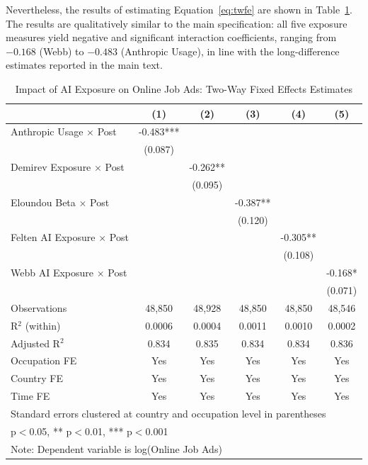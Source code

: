 \documentclass[11pt]{article}
\begin{document}
Nevertheless, the results of estimating Equation~\ref{eq:twfe} are shown in Table~\ref{table:twfe_models}. The results are qualitatively similar to the main specification: all five exposure measures yield negative and significant interaction coefficients, ranging from $-0.168$ (Webb) to $-0.483$ (Anthropic Usage), in line with the long-difference estimates reported in the main text.

\begin{table}[H]
\centering
\caption{Impact of AI Exposure on Online Job Ads: Two-Way Fixed Effects Estimates}
\begin{tabular}{lccccc}
\hline\hline
 & (1) & (2) & (3) & (4) & (5) \\
\midrule
Anthropic Usage $\times$ Post & -0.483*** & & & & \\
 & (0.087) & & & & \\
Demirev Exposure $\times$ Post & & -0.262** & & & \\
 & & (0.095) & & & \\
Eloundou Beta $\times$ Post & & & -0.387** & & \\
 & & & (0.120) & & \\
Felten AI Exposure $\times$ Post & & & & -0.305** & \\
 & & & & (0.108) & \\
Webb AI Exposure $\times$ Post & & & & & -0.168* \\
 & & & & & (0.071) \\
\midrule
Observations & 48,850 & 48,928 & 48,850 & 48,850 & 48,546 \\
R$^2$ (within) & 0.0006 & 0.0004 & 0.0011 & 0.0010 & 0.0002 \\
Adjusted R$^2$ & 0.834 & 0.835 & 0.834 & 0.834 & 0.836 \\
Occupation FE & Yes & Yes & Yes & Yes & Yes \\
Country FE & Yes & Yes & Yes & Yes & Yes \\
Time FE & Yes & Yes & Yes & Yes & Yes \\
\hline\hline
\multicolumn{6}{l}{\footnotesize Standard errors clustered at country and occupation level in parentheses} \\
\multicolumn{6}{l}{\footnotesize * p$<$0.05, ** p$<$0.01, *** p$<$0.001} \\
\multicolumn{6}{l}{\footnotesize Note: Dependent variable is log(Online Job Ads)} \\
\end{tabular}
\label{table:twfe_models}
\end{table}
\end{document}
